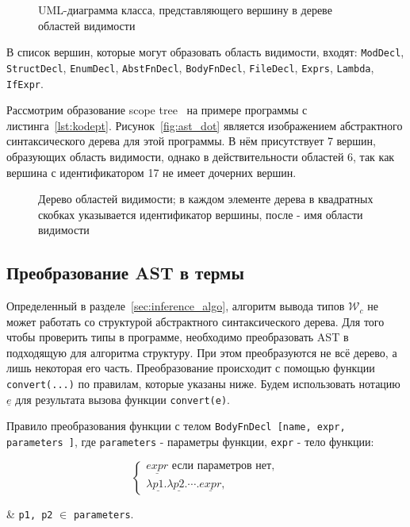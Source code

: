 \begin{figure}
    \centering
    
    \caption{UML-диаграмма класса, представляющего вершину в дереве областей видимости}
    \label{fig:scope_class}
\end{figure}

В список вершин, которые могут образовать область видимости, входят: \lstinline{ModDecl}, \lstinline{StructDecl}, \lstinline{EnumDecl}, \lstinline{AbstFnDecl}, \lstinline{BodyFnDecl}, \lstinline{FileDecl}, \lstinline{Exprs}, \lstinline{Lambda}, \lstinline{IfExpr}.

Рассмотрим образование scope tree~ на примере программы с листинга~\ref{lst:kodept}.
Рисунок~\ref{fig:ast_dot} является изображением абстрактного синтаксического дерева для этой программы.
В нём присутствует 7 вершин, образующих область видимости, однако в действительности областей 6, так как вершина с идентификатором 17 не имеет дочерних вершин.

\begin{figure}[H]
    \centering
    
    \caption{Дерево областей видимости; в каждом элементе дерева в квадратных скобках указывается идентификатор вершины, после - имя области видимости}
    \label{fig:scopes}
\end{figure}

\subsection{Преобразование AST в термы}
\label{subsec:ast_transformation}

Определенный в разделе~\ref{sec:inference_algo}, алгоритм вывода типов $\mathcal{W}_c$ не может работать со структурой абстрактного синтаксического дерева.
Для того чтобы проверить типы в программе, необходимо преобразовать AST в подходящую для алгоритма структуру.
При этом преобразуются не всё дерево, а лишь некоторая его часть.
Преобразование происходит с помощью функции \lstinline{convert(...)} по правилам, которые указаны ниже.
Будем использовать нотацию $\underline{e}$ для результата вызова функции \lstinline{convert(e)}.

Правило преобразования функции с телом \lstinline{BodyFnDecl [name, expr, parameters ]}, где \lstinline{parameters} - параметры функции, \lstinline{expr} - тело функции:

\begin{equation}
    \label{eq:conv_bfn}
    \begin{cases}
        \underline{expr} \text{ если параметров нет}, \\
        \lambda \underline{p1}. \lambda \underline{p2}. \cdots. \underline{expr},
    \end{cases}
\end{equation}
\begin{eqrem}
    & \texttt{p1, p2} $\in$ \texttt{parameters}.
\end{eqrem}


